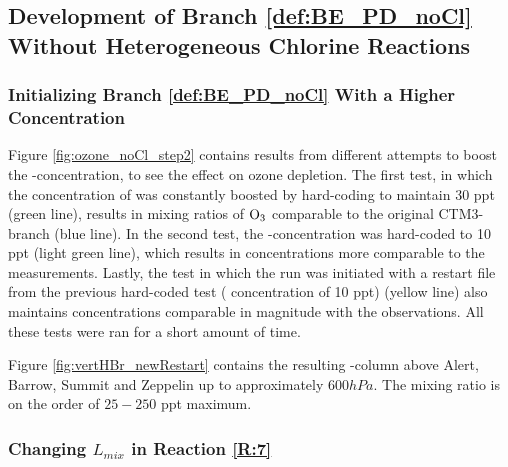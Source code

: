 

%

\subsection{Development of Branch \ref{def:BE_PD_noCl} Without Heterogeneous Chlorine Reactions}

\subsubsection{Initializing Branch \ref{def:BE_PD_noCl} With a Higher  Concentration}

Figure \ref{fig:ozone_noCl_step2} contains results from different attempts to boost the -concentration, to see the effect on ozone depletion. The first test, in which the concentration of  was constantly boosted by hard-coding to maintain 30 ppt (green line), results in mixing ratios of $\mathrm{O_3}$ comparable to the original CTM3-branch (blue line). In the second test, the -concentration was hard-coded to 10 ppt (light green line), which results in concentrations more comparable to the measurements. Lastly, the test in which the run was initiated with a restart file from the previous hard-coded test ( concentration of 10 ppt) (yellow line) also maintains concentrations comparable in magnitude with the observations. All these tests were ran for a short amount of time. 


\medskip

Figure \ref{fig:vertHBr_newRestart} contains the resulting -column above Alert, Barrow, Summit and Zeppelin up to approximately $600 hPa$. The mixing ratio is on the order of $25 - 250$ ppt maximum. 











\subsubsection{Changing $L_{mix}$ in Reaction \ref{R:7}}

